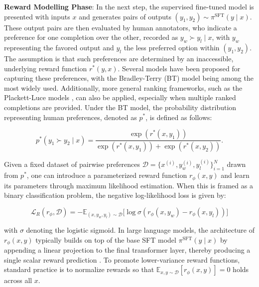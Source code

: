 \textbf{Reward Modelling Phase}: In the next step, the supervised fine-tuned model is presented with inputs $x$ and generates pairs of outputs $(y_1, y_2)\sim \pi^\text{SFT}(y \mid x)$. These output pairs are then evaluated by human annotators, who indicate a preference for one completion over the other, recorded as $y_w\succ y_l \mid x$, with $y_w$ representing the favored output and $y_l$ the less preferred option within $(y_1, y_2)$. The assumption is that such preferences are determined by an inaccessible, underlying reward function $r^*(y, x)$. Several models have been proposed for capturing these preferences, with the Bradley-Terry (BT) model \cite{bradley1952rankanalysis} being among the most widely used. Additionally, more general ranking frameworks, such as the Plackett-Luce models \citep{plackett1975analysis, luce2012individual}, can also be applied, especially when multiple ranked completions are provided. Under the BT model, the probability distribution representing human preferences, denoted as $p^*$, is defined as follows:

\begin{equation}\label{eq:bradley-terry}
    p^*(y_1\succ y_2 \mid x)=\frac{\exp\left(r^*(x, y_1)\right)}{\exp\left(r^*(x, y_1)\right) + \exp\left(r^*(x, y_2)\right)}.
\end{equation}

Given a fixed dataset of pairwise preferences $\mathcal{D}=\bigl\{x^{(i)}, y_w^{(i)}, y_l^{(i)}\bigr\}_{i=1}^N$ drawn from $p^*$, one can introduce a parameterized reward function $r_{\phi}(x, y)$ and learn its parameters through maximum likelihood estimation. When this is framed as a binary classification problem, the negative log-likelihood loss is given by:

\begin{equation}\label{eq:reward_model}
    \mathcal{L}_R(r_{\phi}, \mathcal{D}) = -\mathbb{E}_{(x, y_w, y_l)\sim \mathcal{D}}\bigl[\log \sigma(r_{\phi}(x, y_w)- r_{\phi}(x, y_l))\bigr]
\end{equation}

with $\sigma$ denoting the logistic sigmoid. In large language models, the architecture of $r_{\phi}(x, y)$ typically builds on top of the base SFT model $\pi^\text{SFT}(y \mid x)$ by appending a linear projection to the final transformer layer, thereby producing a single scalar reward prediction \cite{ziegler2020finetuning}. To promote lower-variance reward functions, standard practice is to normalize rewards so that $\mathbb{E}_{x,y\sim \mathcal{D}}\left[r_\phi(x, y)\right] = 0$ holds across all $x$.

